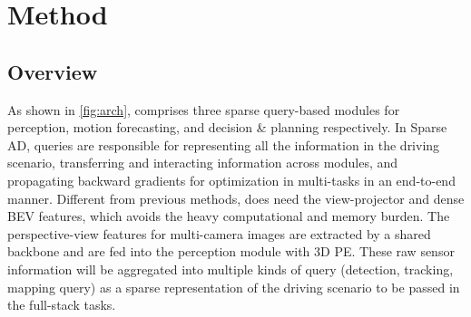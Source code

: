 \section{Method}

\subsection{Overview}

%
As shown in \cref{fig:arch}, \model comprises three sparse query-based modules for perception, motion forecasting, and decision \& planning respectively. In Sparse AD, queries are responsible for representing all the information in the driving scenario, transferring and interacting information across modules, and propagating backward gradients for optimization in multi-tasks in an end-to-end manner. Different from previous methods\cite{hu2023planning}, \model does need the view-projector\cite{philion2020lift} and dense BEV features, which avoids the heavy computational and memory burden\cite{liu2022petr,jiang2023far3d, zhang2023fully}. The perspective-view features for multi-camera images are extracted by a shared backbone and are fed into the perception module with 3D PE\cite{liu2022petr}. These raw sensor information will be aggregated into multiple kinds of query (detection, tracking, mapping query) as a sparse representation of the driving scenario to be passed in the full-stack tasks.

